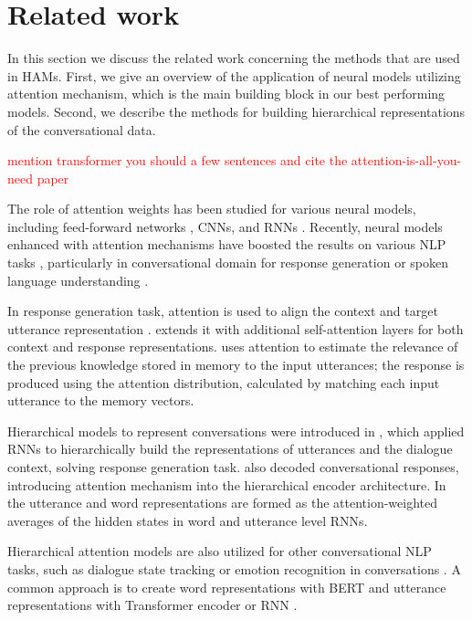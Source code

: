 \section{Related work}

In this section we discuss the related work concerning the methods that are used in HAMs. First, we give an overview of the application of neural models utilizing attention mechanism, which is the main building block in our best performing models. Second, we describe the methods for building hierarchical representations of the conversational data.


\textcolor{red}{mention transformer you should a few sentences and cite the attention-is-all-you-need paper}

The role of attention weights has been studied for various neural models, including feed-forward networks \cite{vaswani2017attention}, CNNs, \cite{atten4} and RNNs \cite{bahdanau2014neural}. Recently, neural models enhanced with attention mechanisms have boosted
the results on various NLP tasks \cite{atten1,atten9,atten2}, particularly 
in conversational domain for response generation \cite{atten7, zhang2019recosa}
or spoken language understanding \cite{Chen2016}. 

In response generation task, attention is used to align the context and target utterance representation \cite{atten7}. \citet{zhang2019recosa} extends it with additional self-attention layers for both context and response representations. \citet{Chen2016} uses attention to estimate the relevance of the previous knowledge stored in memory to the input utterances; the response is produced using the attention distribution, calculated by matching each input utterance to the memory vectors.


Hierarchical models to represent conversations were introduced in \citet{serban2016building}, which applied RNNs to hierarchically build the representations of utterances and the dialogue context, solving response generation task. \citet{atten8} also decoded conversational responses, introducing attention mechanism into the hierarchical encoder architecture. In \citet{atten8} the utterance and word representations are formed as the attention-weighted averages of the hidden states in word and utterance level RNNs. 

Hierarchical attention models are also utilized for other conversational NLP tasks, such as dialogue state tracking \cite{shan2020contextual} or emotion recognition in conversations \cite{li2020hierarchical, ma2021han}. A common approach is to create word representations with BERT and utterance representations with Transformer encoder \cite{shan2020contextual, li2020hierarchical} or RNN \cite{ma2021han}.


